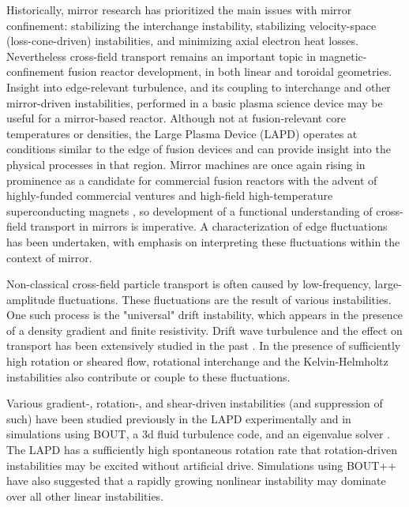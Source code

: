 Historically, mirror research has prioritized the main issues with mirror confinement: stabilizing the interchange instability, stabilizing velocity-space (loss-cone-driven) instabilities, and minimizing axial electron heat losses. Nevertheless cross-field transport remains an important topic in magnetic-confinement fusion reactor development, in both linear and toroidal geometries. Insight into edge-relevant turbulence, and its coupling to interchange and other mirror-driven instabilities, performed in a basic plasma science device may be useful for a mirror-based reactor. Although not at fusion-relevant core temperatures or densities, the Large Plasma Device (LAPD) operates at conditions similar to the edge of fusion devices and can provide insight into the physical processes in that region. Mirror machines are once again rising in prominence as a candidate for commercial fusion reactors with the advent of highly-funded commercial ventures and high-field high-temperature superconducting magnets \cite{WHAM, BEAM}, so development of a functional understanding of cross-field transport in mirrors is imperative. A characterization of edge fluctuations has been undertaken, with emphasis on interpreting these fluctuations within the context of mirror. 

Non-classical cross-field particle transport is often caused by low-frequency, large-amplitude fluctuations. These fluctuations are the result of various instabilities. One such process is the "universal" drift instability, which appears in the presence of a density gradient and finite resistivity. Drift wave turbulence and the effect on transport has been extensively studied in the past \cite{Horton_1999, Tynan_review_2009}. In the presence of sufficiently high rotation or sheared flow, rotational interchange and the Kelvin-Helmholtz instabilities also contribute or couple to these fluctuations. 

Various gradient-, rotation-, and shear-driven instabilities (and suppression of such) have been studied previously in the LAPD experimentally \cite{Schaffner_2012, Schaffner_turbulence_2013, Schaffner_2013} and in simulations using BOUT, a 3d fluid turbulence code, and an eigenvalue solver \cite{Popovich_2010}. The LAPD has a sufficiently high spontaneous rotation rate that rotation-driven instabilities may be excited without artificial drive. Simulations using BOUT++ \cite{Friedman_2013} have also suggested that a rapidly growing nonlinear instability may dominate over all other linear instabilities.

